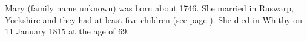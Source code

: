 
Mary (family name unknown) was born about 1746.  She married  in Ruswarp, Yorkshire
and they had at least five children (see page \pageref{Thomas_Hezelwood}).
She died in Whitby on 11 January 1815 at the age of 69.\cite{MaryHezelwoodDeath}
